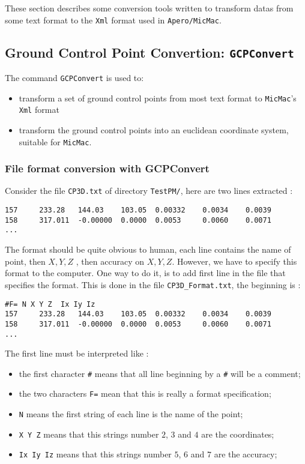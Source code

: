 These section describes some conversion tools  written to transform
datas from some text format to the {\tt Xml} format used in {\tt Apero/MicMac}.

\subsection{Ground Control Point Convertion: {\tt GCPConvert} }
\label{GCPConvert}

The command {\tt GCPConvert} is used to:
\begin{itemize}
 \item transform a set of ground control points from most text format to {\tt MicMac}'s {\tt Xml} format 
\item transform the ground control points into an euclidean coordinate system, suitable for {\tt MicMac}. 
\end{itemize}

\subsubsection{File format conversion with GCPConvert}

Consider the file {\tt CP3D.txt}
of directory {\tt TestPM/}, here are two lines extracted :


\begin{verbatim}
157     233.28   144.03    103.05  0.00332    0.0034    0.0039 
158     317.011  -0.00000  0.0000  0.0053     0.0060    0.0071
...
\end{verbatim}

The format should be quite obvious to human, each line contains the name of point,
then $X,Y,Z$ , then accuracy on $X,Y,Z$. However, we have to specify this format to the computer.
One way to do it, is to add first line in the file that specifies the format.
This is done in the file {\tt CP3D\_Format.txt}, the beginning is :


\begin{verbatim}
#F= N X Y Z  Ix Iy Iz
157     233.28   144.03    103.05  0.00332    0.0034    0.0039 
158     317.011  -0.00000  0.0000  0.0053     0.0060    0.0071
...
\end{verbatim}

The first line must be interpreted like :

\begin{itemize}
   \item  the first character {\tt \#}  means that  all line beginning by a {\tt \#} will be
          a comment;
   \item  the two characters {\tt F=}  mean that this is really a format specification;
   \item  {\tt N}  means the first string of each line is the name of the point;
   \item  {\tt X Y Z}  means that this strings number $2$, $3$ and $4$ are the coordinates;
   \item  {\tt Ix Iy Iz}  means that this strings number $5$, $6$ and $7$ are the accuracy;
\end{itemize}


